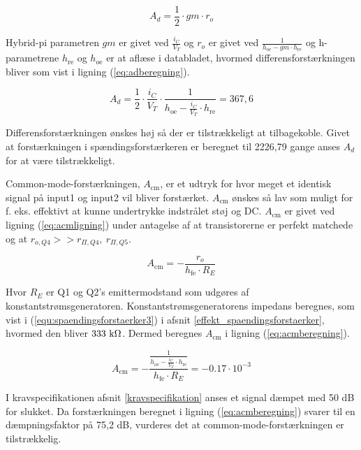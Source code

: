 \begin{equation}
A_d=\frac{1}{2} \cdot gm \cdot r_o
\label{eq:diffforstaerkning}
\end{equation}

Hybrid-pi parametren $gm$ er givet ved $\frac{i_C}{V_T}$ og $r_o$ er givet ved $\frac{1}{h_\mathrm{oe} - gm \cdot h_\mathrm{re}}$ og h-parametrene $h_\mathrm{re}$ og $h_\mathrm{oe}$ er at aflæse i databladet, hvormed differensforstærkningen bliver som vist i ligning (\ref{eq:adberegning}).

\begin{equation}
A_d=\frac{1}{2} \cdot \frac{i_C}{V_T} \cdot \frac{1}{h_\mathrm{oe} - \frac{i_C}{V_T} \cdot h_\mathrm{re}}=367,6
\label{eq:adberegning}
\end{equation}

Differensforstærkningen ønskes høj så der er tilstrækkeligt at tilbagekoble. Givet at forstærkningen i spændingsforstærkeren er beregnet til 2226,79 gange anses $A_d$ for at være tilstrækkeligt. 

Common-mode-forstærkningen, $A_\mathrm{cm}$, er et udtryk for hvor meget et identisk signal på input1 og input2 vil bliver forstærket. $A_\mathrm{cm}$ ønskes så lav som muligt for f. eks. effektivt at kunne undertrykke indstrålet støj og DC. $A_\mathrm{cm}$ er givet ved ligning (\ref{eq:acmligning}) under antagelse af at transistorerne er perfekt matchede og  at $r_{o,Q4}>>r_{\Pi,Q4},~r_{\Pi,Q5}$. 

\begin{equation}
A_\mathrm{cm} = -\frac{r_o}{h_\mathrm{fe} \cdot R_E}
\label{eq:acmligning}
\end{equation}

Hvor $R_E$ er Q1 og Q2's emittermodstand som udgøres af konstantstrømsgeneratoren. Konstantstrømsgeneratorens impedans beregnes, som vist i (\ref{equ:spaendingsforstaerker3}) i afsnit \ref{effekt_spaendingsforstaerker}, hvormed den bliver $333~\mathrm{k}\ohm$. Dermed beregnes $A_\mathrm{cm}$ i ligning (\ref{eq:acmberegning}).

\begin{equation}
A_\mathrm{cm} = -\frac{\frac{1}{h_\mathrm{oe} - \frac{i_C}{V_T} \cdot h_\mathrm{re}}}{h_\mathrm{fe} \cdot R_E} = -0.17 \cdot 10^{-3}
\label{eq:acmberegning}
\end{equation}

I kravspecifikationen afsnit \ref{kravspecifikation} anses et signal dæmpet med 50 dB for slukket. Da forstærkningen beregnet i ligning (\ref{eq:acmberegning}) svarer til en dæmpningsfaktor på 75,2 dB, vurderes det at common-mode-forstærkningen er tilstrækkelig. 


